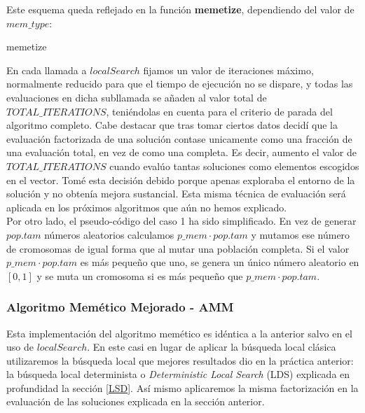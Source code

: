 \documentclass[11pt,a4paper]{article}
\begin{document}
	Este esquema queda reflejado en la función \textbf{memetize}, dependiendo del valor de $mem\_type$:
	
	\begin{algorithm}[H]
		\caption{memetize}
	\end{algorithm}

	En cada llamada a $localSearch$ fijamos un valor de iteraciones máximo, normalmente reducido para que el tiempo de ejecución no se dispare, y todas las evaluaciones en dicha subllamada se añaden al valor total de $TOTAL\_ITERATIONS$, teniéndolas en cuenta para el criterio de parada del algoritmo completo. Cabe destacar que tras tomar ciertos datos decidí que la evaluación factorizada de una solución contase unicamente como una fracción de una evaluación total, en vez de como una completa. Es decir, aumento el valor de $TOTAL\_ITERATIONS$ cuando evalúo tantas soluciones como elementos escogidos en el vector. Tomé esta decisión debido porque apenas exploraba el entorno de la solución y no obtenía mejora sustancial. Esta misma técnica de evaluación será aplicada en los próximos algoritmos que aún no hemos explicado. \\
	
	Por otro lado, el pseudo-código del caso 1 ha sido simplificado. En vez de generar $pop.tam$ números aleatorios calculamos $p\_mem \cdot pop.tam$ y mutamos ese número de cromosomas de igual forma que al mutar una población completa. Si el valor $p\_mem \cdot pop.tam$ es más pequeño que uno, se genera un único número aleatorio en $[0,1]$ y se muta un cromosoma si es más pequeño que $p\_mem \cdot pop.tam$. \\

	\subsubsection{ Algoritmo Memético Mejorado - AMM }
	
	Esta implementación del algoritmo memético es idéntica a la anterior salvo en el uso de $localSearch$. En este casi en lugar de aplicar la búsqueda local clásica utilizaremos la búsqueda local que mejores resultados dio en la práctica anterior: la búsqueda local determinista o \emph{Deterministic Local Search} (LDS) explicada en profundidad la sección \ref{LSD}. Así mismo aplicaremos la misma factorización en la evaluación de las soluciones explicada en la sección anterior.
	
\end{document}

